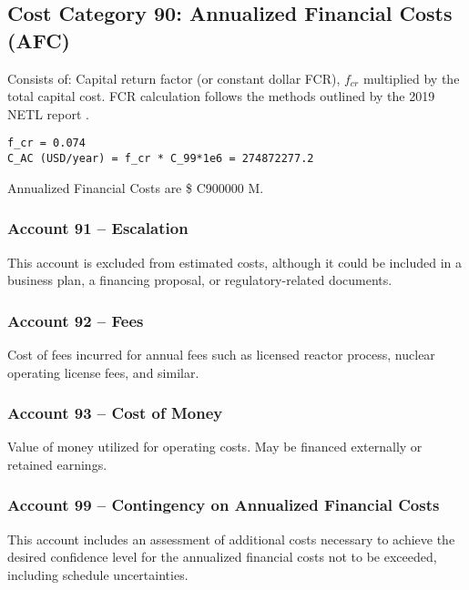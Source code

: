 \subsection{Cost Category 90: Annualized Financial Costs (AFC)}

Consists of: Capital return factor (or constant dollar FCR), $f_{cr}$ multiplied by the total capital cost. FCR calculation follows the methods outlined by the 2019 NETL report \cite{NETL2019a}.

\begin{verbatim} 
f_cr = 0.074 
C_AC (USD/year) = f_cr * C_99*1e6 = 274872277.2
\end{verbatim} 

Annualized Financial Costs are \$ C900000 M.

\subsubsection*{Account 91 – Escalation}
This account is excluded from estimated costs, although it could be included in a business plan, a financing proposal, or regulatory-related documents.

\subsubsection*{Account 92 – Fees}
Cost of fees incurred for annual fees such as licensed reactor process, nuclear operating license fees, and similar.

\subsubsection*{Account 93 – Cost of Money}
Value of money utilized for operating costs. May be financed externally or retained earnings.

\subsubsection*{Account 99 – Contingency on Annualized Financial Costs}
This account includes an assessment of additional costs necessary to achieve the desired confidence level for the annualized financial costs not to be exceeded, including schedule uncertainties.
